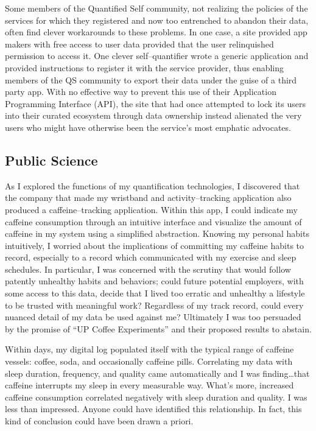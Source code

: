 \documentclass{article}
\begin{document}
Some members of the Quantified Self community,
not realizing the policies of the services for which they registered and now too entrenched to abandon their data,
often find clever workarounds to these problems.
In one case,
a site provided app makers with free access to user data provided that the user relinquished permission to access it.
One clever self--quantifier wrote a generic application and provided instructions to register it with the service provider,
thus enabling members of the QS community to export their data under the guise of a third party app.
With no effective way to prevent this use of their Application Programming Interface (API),
the site that had once attempted to lock its users into their curated ecosystem through data ownership instead alienated the very users who might have otherwise been the service's most emphatic advocates.

\subsection*{Public Science}
As I explored the functions of my quantification technologies,
I discovered that the company that made my wristband and activity--tracking application also produced a caffeine--tracking application.
Within this app,
I could indicate my caffeine consumption through an intuitive interface and visualize the amount of caffeine in my system using a simplified abstraction.
Knowing my personal habits intuitively,
I worried about the implications of committing my caffeine habits to record,
especially to a record which communicated with my exercise and sleep schedules.
In particular,
I was concerned with the scrutiny that would follow patently unhealthy habits and behaviors;
could future potential employers,
with some access to this data,
decide that I lived too erratic and unhealthy a lifestyle to be trusted with meaningful work? Regardless of my track record,
could every nuanced detail of my data be used against me? Ultimately I was too persuaded by the promise of ``UP Coffee Experiments'' and their proposed results to abstain.

Within days,
my digital log populated itself with the typical range of caffeine vessels:
coffee,
soda,
and occasionally caffeine pills.
Correlating my data with sleep duration,
frequency,
and quality came automatically and I was finding\dots that caffeine interrupts my sleep in every measurable way.
What's more,
increased caffeine consumption correlated negatively with sleep duration and quality.
I was less than impressed.
Anyone could have identified this relationship.
In fact,
this kind of conclusion could have been drawn a priori.
\end{document}
